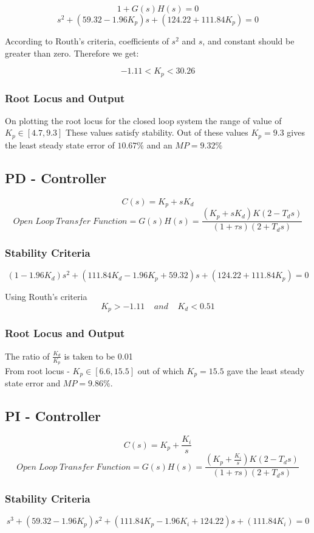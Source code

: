 \documentclass{article}
\begin{document}
\[ 1 + G(s)H(s) = 0\]
\[s^2 + (59.32 - 1.96K_p)s + (124.22 + 111.84 K_p) = 0\]

According to Routh's criteria, coefficients of $s^2$ and $s$, and constant should be greater than zero. Therefore we get:

\[ -1.11 < K_p < 30.26\]

\subsubsection{Root Locus and Output}
On plotting the root locus for the closed loop system the range of value of $K_p \in [4.7, 9.3]$
These values satisfy stability.
Out of these values $K_p = 9.3$ gives the least steady state error of $10.67 \%$ and an $MP = 9.32 \%$


\subsection{PD - Controller}
\[C(s) = K_p + s K_d\]
\[Open \; Loop \; Transfer \; Function = G(s)H(s) = \frac{(K_p + s K_d)K(2 - T_d s)}{(1 + \tau s)(2 + T_d s)}\]

\subsubsection{Stability Criteria}
\[(1-1.96K_d)s^2 + (111.84K_d - 1.96K_p + 59.32)s + (124.22 + 111.84 K_p) = 0\]
                      
Using Routh's criteria
\[ K_p > -1.11 \;\;\;\; and \;\;\;\; K_d < 0.51\]

\subsubsection{Root Locus and Output}
The ratio of $\frac{K_d}{K_p}$ is taken to be 0.01\\
From root locus - $K_p \in [6.6,15.5]$ out of which $K_p = 15.5$ gave the least steady state error and $MP = 9.86 \%$.

\subsection{PI - Controller}
\[C(s) = K_p + \frac{K_i}{s}\]
\[Open \; Loop \; Transfer \; Function = G(s)H(s) = \frac{(K_p + \frac{K_i}{s})K(2 - T_d s)}{(1 + \tau s)(2 + T_d s)}\]

\subsubsection{Stability Criteria}
\[s^3 + (59.32 - 1.96K_p)s^2 + (111.84K_p - 1.96K_i + 124.22)s + (111.84K_i) = 0\]
\end{document}
